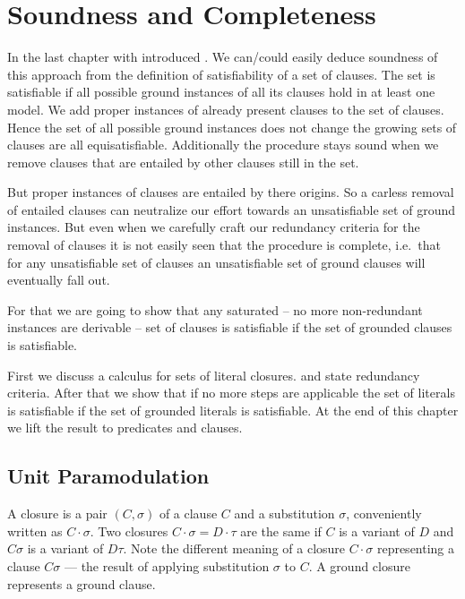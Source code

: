 
\chapter{Soundness and Completeness}

In the last chapter with introduced \InstGenEQ.
We can/could easily deduce soundness of this approach
from the definition of satisfiability of a set of clauses.
The set is satisfiable
if all possible ground instances of all its clauses
hold in at least one model.
We add proper instances of already present clauses to the set of clauses.
Hence the set of all possible ground instances does not change
the growing sets of clauses are all equisatisfiable.
Additionally the procedure stays sound when we remove clauses that are
entailed by other clauses still in the set.

But proper instances of clauses
are entailed by there origins. So a carless removal of entailed clauses
can neutralize our effort towards an unsatisfiable set of ground instances.
%
But even when we carefully craft our redundancy criteria for the removal of clauses
it is not easily seen that the procedure is complete,
i.e.~that for any unsatisfiable set of clauses an unsatisfiable
set of ground clauses will eventually fall out.

For that we are going to show
that any saturated -- no more non-redundant instances are derivable --
set of clauses is satisfiable if the set of grounded clauses is satisfiable.

First we discuss a calculus for sets of literal closures.
and state redundancy criteria.
After that we show that if no more steps are applicable
the set of literals is satisfiable
if the set of grounded literals is satisfiable.
At the end of this chapter we lift the result to predicates and clauses.





\section{Unit Paramodulation}
\begin{definition}
    A closure is a pair \( (C,\sigma) \) of a clause \( C \) and a substitution \( \sigma \),
    conveniently written as \( C\cdot\sigma \). Two closures \( C\cdot\sigma = D\cdot\tau \)
    are the same if \( C \) is a variant of \( D \) and \( C\sigma \) is a variant of \( D\tau \).
    Note the different meaning of a closure \( C\cdot\sigma \) representing a clause \( C\sigma \)
    --- the result of applying substitution \( \sigma \) to \( C \).
    A ground closure represents a ground clause.
\end{definition}

